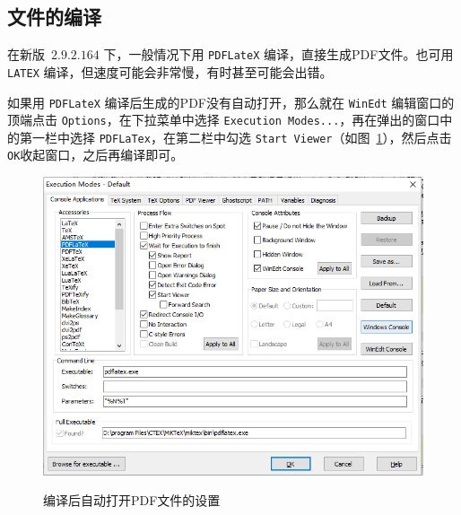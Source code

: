 \subsection{\CTeX{} 文件的编译}
在新版~\CTeX$2.9.2.164$ 下，一般情况下用{ \tt PDFLateX} 编译，直接生成PDF文件。也可用{ \tt LATEX} 编译，但速度可能会非常慢，有时甚至可能会出错。

如果用{ \tt PDFLateX} 编译后生成的PDF没有自动打开，那么就在{ \tt WinEdt} 编辑窗口的顶端点击{ \tt Options}，在下拉菜单中选择{ \tt Execution Modes...}，再在弹出的窗口中的第一栏中选择{ \tt PDFLaTex}，在第二栏中勾选{ \tt Start Viewer}（如图~\ref{fig:optionPDF}），然后点击{ \tt OK}收起窗口，之后再编译即可。
\begin{figure}
	\centering
	\includegraphics[width=16cm]{options.png}\\
	\caption{编译后自动打开PDF文件的设置}\label{fig:optionPDF}
\end{figure}

